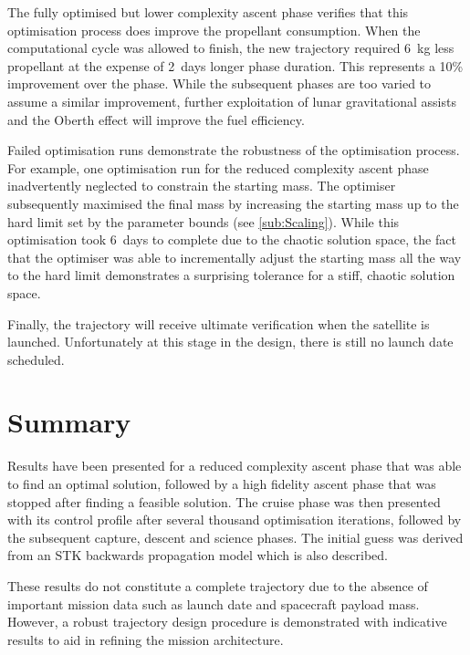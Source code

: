 
The fully optimised but lower complexity ascent phase verifies that this optimisation process does improve the propellant consumption. When the computational cycle was allowed to finish, the new trajectory required 6~kg less propellant at the expense of 2~days longer phase duration. This represents a 10\% improvement over the phase. While the subsequent phases are too varied to assume a similar improvement, further exploitation of lunar gravitational assists and the Oberth effect will improve the fuel efficiency.

Failed optimisation runs demonstrate the robustness of the optimisation process. For example, one optimisation run for the reduced complexity ascent phase inadvertently neglected to constrain the starting mass. The optimiser subsequently maximised the final mass by increasing the starting mass up to the hard limit set by the parameter bounds (see \autoref{sub:Scaling}). While this optimisation took 6~days to complete due to the chaotic solution space, the fact that the optimiser was able to incrementally adjust the starting mass all the way to the hard limit demonstrates a surprising tolerance for a stiff, chaotic solution space.


Finally, the trajectory will receive ultimate verification when the satellite is launched. Unfortunately at this stage in the design, there is still no launch date scheduled.





\section{Summary} \label{sec:Results-summary}

Results have been presented for a reduced complexity ascent phase that was able to find an optimal solution, followed by a high fidelity ascent phase that was stopped after finding a feasible solution. The cruise phase was then presented with its control profile after several thousand optimisation iterations, followed by the subsequent capture, descent and science phases. The initial guess was derived from an STK backwards propagation model which is also described.

These results do not constitute a complete trajectory due to the absence of important mission data such as launch date and spacecraft payload mass. However, a robust trajectory design procedure is demonstrated with indicative results to aid in refining the mission architecture. 

